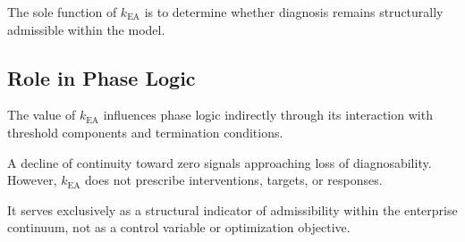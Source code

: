 The sole function of $k_{\mathrm{EA}}$ is to determine whether diagnosis
remains structurally admissible within the model.

\subsection{Role in Phase Logic}

The value of $k_{\mathrm{EA}}$ influences phase logic indirectly through
its interaction with threshold components and termination conditions.

A decline of continuity toward zero signals approaching loss of
diagnosability.
However, $k_{\mathrm{EA}}$ does not prescribe interventions, targets, or
responses.

It serves exclusively as a structural indicator of admissibility within
the enterprise continuum, not as a control variable or optimization
objective.

